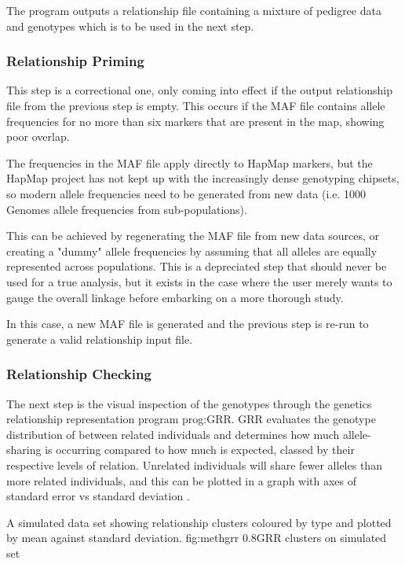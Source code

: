 The program outputs a relationship file containing a mixture of pedigree data and genotypes which is to be used in the next step.

\subsubsection{Relationship Priming}

This step is a correctional one, only coming into effect if the output relationship file from the previous step is empty. This occurs if the MAF file contains allele frequencies for no more than six markers that are present in the map, showing poor overlap.

The frequencies in the MAF file apply directly to HapMap markers, but the HapMap project has not kept up with the increasingly dense genotyping chipsets, so modern allele frequencies need to be generated from new data (i.e. 1000 Genomes allele frequencies from sub-populations).

This can be achieved by regenerating the MAF file from new data sources, or creating a "dummy" allele frequencies by assuming that all alleles are equally represented across populations. This is a depreciated step that should never be used for a true analysis, but it exists in the case where the user merely wants to gauge the overall linkage before embarking on a more thorough study.

In this case, a new MAF file is generated and the previous step is re-run to generate a valid relationship input file.

\subsubsection{Relationship Checking}

The next step is the visual inspection of the genotypes through the genetics relationship representation program \gls{prog:GRR}. GRR evaluates the genotype distribution of between related individuals and determines how much allele-sharing is occurring compared to how much is expected, classed by their respective levels of relation. Unrelated individuals will share fewer alleles than more related individuals, and this can be plotted in a graph with axes of standard error vs standard deviation \cite{grr}. 

	{A simulated data set showing relationship clusters coloured by type and plotted by mean against standard deviation.}
	{fig:methgrr}
	{0.8}{GRR clusters on simulated set}
	
